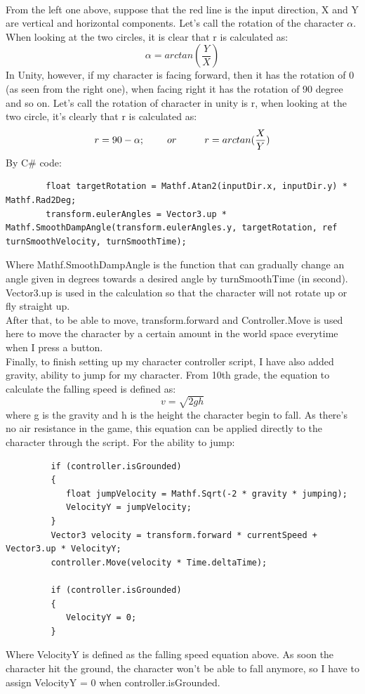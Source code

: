 \documentclass[a4paper, 13pt]{extarticle}
\begin{document}
 	 	\\[0.02cm]
 	 	From the left one above, suppose that the red line is the input direction, X and Y are vertical and horizontal components. Let's call the rotation of the character  {$\alpha$}. When looking at the two circles, it is clear that r is calculated as: 
 	 	\\[-0.5cm]
 	 	\[\alpha = arctan(\frac{Y}{X})\]
 	 	In Unity, however, if my character is facing forward, then it has the rotation of 0 (as seen from the right one), when facing right it has the rotation of 90 degree and so on. Let's call the rotation of character in unity is r, when looking at the two circle, it's clearly that r is calculated as: \\[-0.5cm]
 	 	 \[r = 90 - \alpha; \hspace{0.8cm} or \hspace{1.0cm} r = arctan(\frac{X}{Y})\] 
 	 	By C\# code:
 	 	\begin{lstlisting}
 	 	float targetRotation = Mathf.Atan2(inputDir.x, inputDir.y) * Mathf.Rad2Deg;
 	 	transform.eulerAngles = Vector3.up * Mathf.SmoothDampAngle(transform.eulerAngles.y, targetRotation, ref turnSmoothVelocity, turnSmoothTime);
 	 	\end{lstlisting}
 	 	
 	 	Where Mathf.SmoothDampAngle is the function that can gradually change an angle given in degrees towards a desired angle by turnSmoothTime (in second). Vector3.up is used in the calculation so that the character will not rotate up or fly straight up.  \\[0.15cm] After that, to be able to move, transform.forward and Controller.Move is used here to move the character by a certain amount in the world space everytime when I press a button. \\[0.15cm] Finally, to finish setting up my character controller script, I have also added gravity, ability to jump for my character. From 10th grade, the equation to calculate the falling speed is defined as: 
 	 	\\[-0.5cm]
 	 	 \[v = \sqrt{2gh}\]
 	 	 where g is the gravity and h is the height the character begin to fall. As there's no air resistance in the game, this equation can be applied directly to the character through the script. For the ability to jump:
 	 	 \begin{lstlisting}
 	 	 if (controller.isGrounded)
 	 	 {
 	 	 	float jumpVelocity = Mathf.Sqrt(-2 * gravity * jumping);
 	 	 	VelocityY = jumpVelocity;
 	 	 }
 	 	 Vector3 velocity = transform.forward * currentSpeed + Vector3.up * VelocityY;
 	 	 controller.Move(velocity * Time.deltaTime);
 	 	 
 	 	 if (controller.isGrounded)
 	 	 {
 	 	 	VelocityY = 0;  
 	 	 }
 	 	 \end{lstlisting}
 	 	 Where VelocityY is defined as the falling speed equation above. As soon the character hit the ground, the character won't be able to fall anymore, so I have to assign VelocityY = 0 when controller.isGrounded. 
\end{document}
